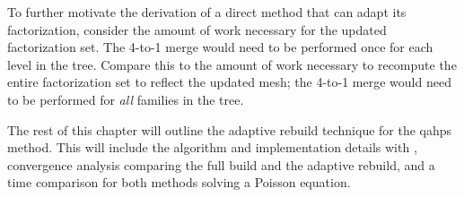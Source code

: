 To further motivate the derivation of a direct method that can adapt its factorization, consider the amount of work necessary for the updated factorization set. The 4-to-1 merge would need to be performed once for each level in the tree. Compare this to the amount of work necessary to recompute the entire factorization set to reflect the updated mesh; the 4-to-1 merge would need to be performed for {\em all} families in the tree.

The rest of this chapter will outline the adaptive rebuild technique for the \gls{qahps} method. This will include the algorithm and implementation details with \pforest, convergence analysis comparing the full build and the adaptive rebuild, and a time comparison for both methods solving a Poisson equation.